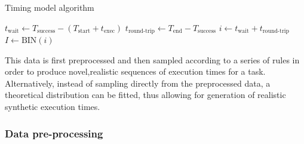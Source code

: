 
\begin{algorithm}
    \caption{Timing model algorithm}

    $t_\text{wait} \leftarrow T_\text{success} - (T_\text{start} + t_\text{exec})$\;
    $t_\text{round-trip} \leftarrow T_\text{end} - T_\text{success}$\;
    $i \leftarrow t_\text{wait} + t_\text{round-trip}$ 
    $I \leftarrow \text{BIN}(i)$ 

      

\end{algorithm}


This data is first preprocessed and then sampled according to a series of rules in order to produce novel,realistic sequences of execution times for a task.
Alternatively, instead of sampling directly from the preprocessed data, a theoretical distribution can be fitted, thus allowing for generation of realistic synthetic execution times.

\subsubsection{Data pre-processing}

